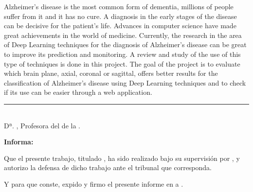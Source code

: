 Alzheimer's disease is the most common form of dementia, millions of people suffer from it and it has no cure.
A diagnosis in the early stages of the disease can be decisive for the patient's life.
Advances in computer science have made great achievements in the world of medicine.
Currently, the research in the area of Deep Learning techniques for the diagnosis of Alzheimer's disease can be great
to improve its prediction and monitoring.
A review and study of the use of this type of techniques is done in this project.
The goal of the project is to evaluate which brain plane, axial, coronal or sagittal, offers better results for the
classification of Alzheimer's disease using Deep Learning techniques and to check if its use can be easier through a
web application.

%
%
%
%
%
%


\cleardoublepage
\thispagestyle{empty}

\noindent\rule[-1ex]{\textwidth}{2pt}\\[4.5ex]

Dª. \textbf{\myProf}, Profesora del \myDepartment de la \myUni.

\vspace{0.5cm}

\textbf{Informa:}

\vspace{0.5cm}

Que el presente trabajo, titulado \textit{\textbf{\myTitle}},
ha sido realizado bajo su supervisión por \textbf{\myName}, y autorizo la defensa de dicho trabajo ante el tribunal
que corresponda.

\vspace{0.5cm}

Y para que conste, expido y firmo el presente informe en \myLocation a \myTime.

